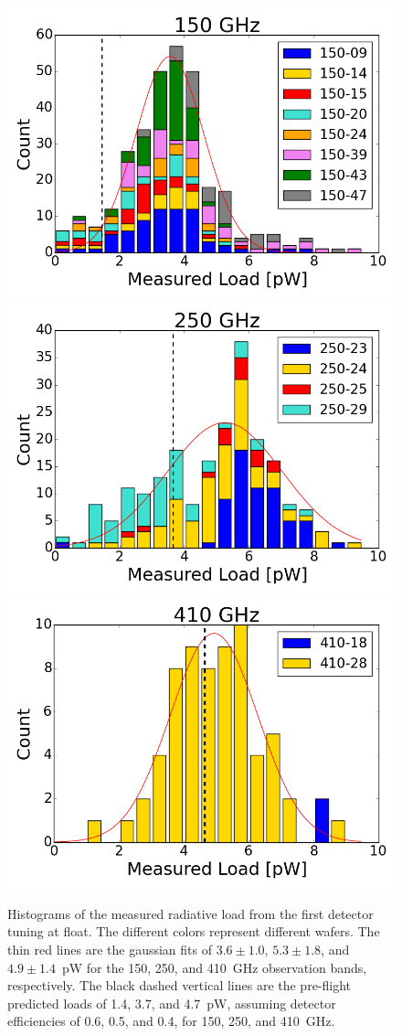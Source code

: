 \begin{figure}[htp]
\begin{center}
\includegraphics[width=0.32\columnwidth]{figures/thesis_150_radiative_load_hist.png}
\includegraphics[width=0.32\columnwidth]{figures/thesis_250_radiative_load_hist.png}
\includegraphics[width=0.32\columnwidth]{figures/thesis_410_radiative_load_hist.png}
\caption[Radiative load histograms]{Histograms of the measured radiative load from the first detector tuning at float. 
The different colors represent different wafers.  
The thin red lines are the gaussian fits of $3.6\pm1.0, \, 5.3\pm1.8$, and $4.9\pm1.4$~pW for the 150, 250, and 410~GHz observation bands, respectively. 
The black dashed vertical lines are the pre-flight predicted loads of 1.4, 3.7, and 4.7~pW, assuming detector efficiencies of 0.6, 0.5, and 0.4, for 150, 250, and 410~GHz. 
\label{fig:radiative_load_histograms} }
\end{center}
\end{figure}



